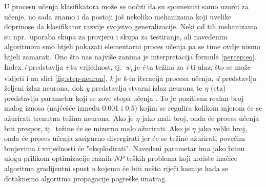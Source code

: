 \documentclass[times, utf8, zavrsni]{fer}
\begin{document}
U procesu učenja klasifikatora može se uočiti da su spomenuti samo uzorci za učenje, no sada znamo i da postoji još nekoliko mehanizama koji uvelike doprinose da klasifikator razvije svojstvo generalizacije. Neki od tih mehanizama su npr.\ uporaba skupa za provjeru i skupa za testiranje, ali navedenim algoritmom smo htjeli pokazati elementarni proces učenja pa se time ovdje nismo htjeli zamarati. Ono što nas najviše zanima je interpretacija formule \eqref{percep:eq}. Index \textit{i} predstavlja \textit{i}-tu vrijednost, tj.\ \textit{w\textsubscript{i}} je \textit{i}-ta težina za \textit{i}-ti ulaz, što se može vidjeti i na slici \ref{fig:step-neuron}, \textit{k} je \textit{k}-ta iteracija procesa učenja, \textit{d} predstavlja željeni  izlaz neurona, dok \textit{y} predstavlja stvarni izlaz neurona te $\eta$ (eta) predstavlja parametar koji se zove stopa učenja . To je pozitivan realan broj malog iznosa (najčešće između 0.001 i 0.5) kojim se regulira kolikom mjerom će se ažurirati trenutna težina neurona. Ako je $\eta$ jako mali broj, onda će proces učenja biti prespor, tj.\ težine će se mizerno malo ažurirati. Ako je $\eta$ jako veliki broj, onda će proces učenja zasigurno divergirati jer će se težine ažurirati povećim brojevima i vrijednosti će "eksplodirati". Navedeni parametar ima jako bitnu ulogu prilikom optimizacije raznih \textit{NP} teških problema koji koriste inačice algoritma gradijentni spust o kojemu će biti nešto riječi kasnije kada se dotaknemo algoritma propagacije pogreške unatrag.

\bigskip
\end{document}
